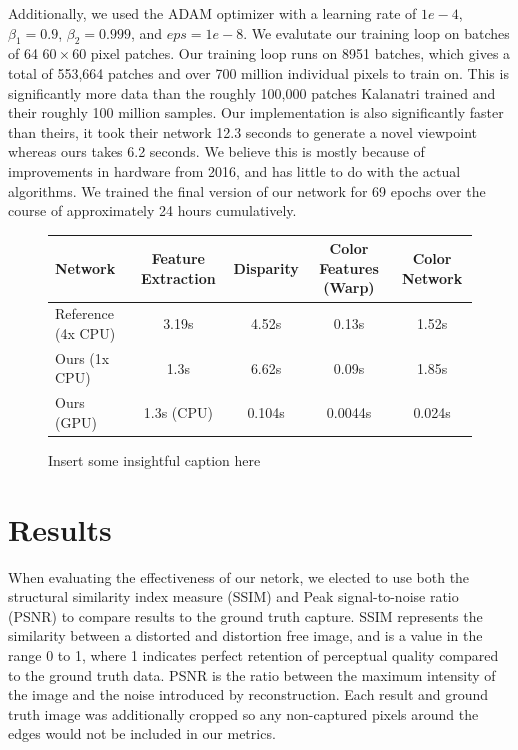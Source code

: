 \documentclass[10pt,twocolumn,letterpaper]{article}
\begin{document}
Additionally, we used the ADAM optimizer with a learning rate of $1e-4$, $\beta_1 = 0.9$, $\beta_2 = 0.999$, and $eps = 1e-8$.
We evalutate our training loop on batches of 64 $60 \times 60$ pixel patches. 
Our training loop runs on 8951 batches, which gives a total of 553,664 patches and over 700 million
individual pixels to train on. 
This is significantly more data than the roughly 100,000 patches Kalanatri \etal trained and their roughly 100 million samples.
Our implementation is also significantly faster than theirs, it took their network 12.3 seconds to generate a novel viewpoint
whereas ours takes 6.2 seconds. We believe this is mostly because of improvements in hardware from 2016, and has little to do with the
actual algorithms. We trained the final version of our network for 69 epochs over the course of approximately 24 hours cumulatively.

\begin{figure}
\begin{center}
\begin{tabular}{|l | c c c c|}
    \hline
    Network & Feature Extraction & Disparity & Color Features (Warp) & Color Network \\ \hline
    Reference (4x CPU) & 3.19s & 4.52s & 0.13s & 1.52s \\
    Ours (1x CPU) & 1.3s & 6.62s & 0.09s & 1.85s \\
    Ours (GPU) & 1.3s (CPU) & 0.104s & 0.0044s & 0.024s \\ \hline
\end{tabular}
\caption{Insert some insightful caption here}
\end{center}
\end{figure}


\section{Results}

When evaluating the effectiveness of our netork, we elected to use both the structural similarity index measure (SSIM)
and Peak signal-to-noise ratio (PSNR) to compare results to the ground truth capture. SSIM represents the similarity
between a distorted and distortion free image, and is a value in the range 0 to 1, where 1 indicates perfect retention
of perceptual quality compared to the ground truth data. PSNR is the ratio between the maximum intensity of the image
and the noise introduced by reconstruction. Each result and ground truth image was additionally cropped so any
non-captured pixels around the edges would not be included in our metrics.
\end{document}

